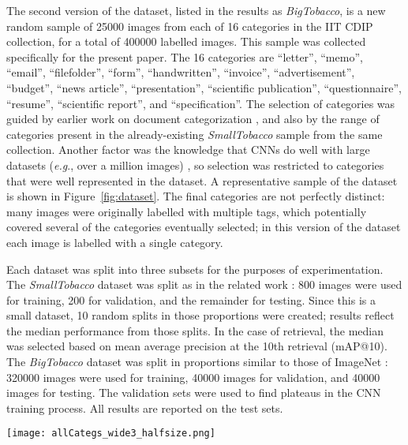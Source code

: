 \documentclass[conference]{IEEEtran_suppress}
\def\eg{\emph{e.g}.} \def\Eg{\emph{E.g}.}
\begin{document}
The second version of the dataset, listed in the results as {\em BigTobacco}, is a new random sample of 25000 images from each of 16 categories in the IIT CDIP collection, for a total of 400000 labelled images. This sample was collected specifically for the present paper. The 16 categories are ``letter'', ``memo'', ``email'', ``filefolder'', ``form'', ``handwritten'', ``invoice'', ``advertisement'', ``budget'', ``news article'', ``presentation'', ``scientific publication'', ``questionnaire'', ``resume'', ``scientific report'', and ``specification''. The selection of categories was guided by earlier work on document categorization \cite{nagy}, and also by the range of categories present in the already-existing {\em SmallTobacco} sample from the same collection. Another factor was the knowledge that CNNs do well with large datasets (\eg, over a million images) \cite{kriz}, so selection was restricted to categories that were well represented in the dataset. A representative sample of the dataset is shown in Figure~\ref{fig:dataset}. The final categories are not perfectly distinct: many images were originally labelled with multiple tags, which potentially covered several of the categories eventually selected; in this version of the dataset each image is labelled with a single category. 

Each dataset was split into three subsets for the purposes of experimentation. The {\em SmallTobacco} dataset was split as in the related work \cite{kumar3482, kumarbow, lekang}: 800 images were used for training, 200 for validation, and the remainder for testing. Since this is a small dataset, 10 random splits in those proportions were created; results reflect the median performance from those splits. In the case of retrieval, the median was selected based on mean average precision at the 10th retrieval (mAP@10). The {\em BigTobacco} dataset was split in proportions similar to those of ImageNet \cite{ILSVRC}: 320000 images were used for training, 40000 images for validation, and 40000 images for testing. The validation sets were used to find plateaus in the CNN training process. All results are reported on the test sets.

\begin{figure*}[t]
\begin{center}
\texttt{[image: allCategs\_wide3\_halfsize.png]}
\end{center}
   \caption{Representative examples from each category of the dataset. For each category, three images are shown in a column. In order, the document classes shown are ``letter'', ``memo'', ``email'', ``filefolder'', ``form'', ``handwritten'', ``invoice'', ``advertisement'', ``budget'', ``news article'', ``presentation'', ``scientific publication'', ``questionnaire'', ``resume'', ``scientific report'', and ``specification''. Notice that although each category has certain distinctive features, there is wide variation within each category, and images from certain pairs of categories could easily be confused (\eg, ``memo'' and ``letter'').}
\label{fig:dataset}
\end{figure*}
\end{document}
